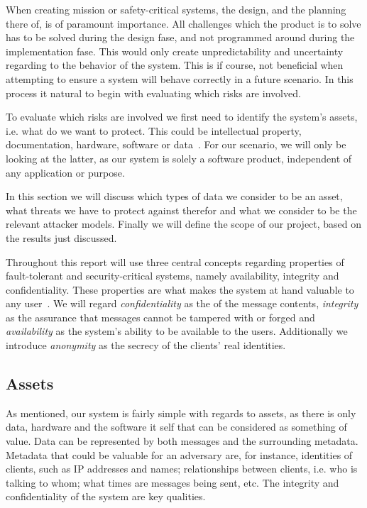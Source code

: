 
When creating mission or safety-critical systems, the design, and the
planning there of, is of paramount importance. All challenges which
the product is to solve has to be solved during the design fase, and
not programmed around during the implementation fase. This would only
create unpredictability and uncertainty regarding to the behavior of
the system. This is if course, not beneficial when attempting to
ensure a system will behave correctly in a future scenario. In this
process it natural to begin with evaluating which risks are involved.

To evaluate which risks are involved we first need to identify the
system's assets, i.e. what do we want to protect. This could be
intellectual property, documentation, hardware, software or
data~\cite[p. 528]{pfleeger}. For our scenario, we will only be
looking at the latter, as our system is solely a software product,
independent of any application or purpose.

In this section we will discuss which types of data we consider to be
an asset, what threats we have to protect against therefor and what we
consider to be the relevant attacker models. Finally we will define
the scope of our project, based on the results just discussed.

Throughout this report will use three central concepts regarding
properties of fault-tolerant and security-critical systems, namely
availability, integrity and confidentiality. These properties are what
makes the system at hand valuable to any
user~\cite{anderson}. We will regard \emph{confidentiality}
as the of the message contents, \emph{integrity} as the assurance that
messages cannot be tampered with or forged and \emph{availability} as
the system's ability to be available to the users. Additionally we
introduce \emph{anonymity} as the secrecy of the clients' real
identities.

\subsection{Assets}

As mentioned, our system is fairly simple with regards to assets, as
there is only data, hardware and the software it self that can be
considered as something of value. Data can be represented by both
messages and the surrounding metadata. Metadata that could be valuable
for an adversary are, for instance, identities of clients, such as IP
addresses and names; relationships between clients, i.e. who is
talking to whom; what times are messages being sent, etc. The
integrity and confidentiality of the system are key qualities.

